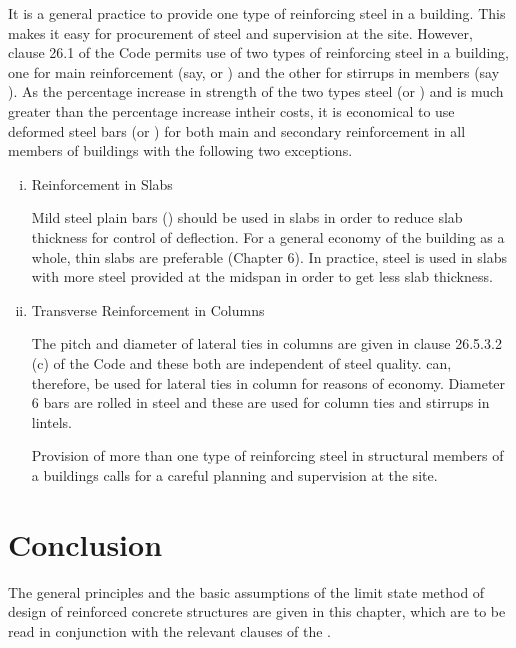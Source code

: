 It is a general practice to provide one type of reinforcing steel in a
building. This makes it easy for procurement of steel and supervision 
at the site. However, clause 26.1 of the Code permits use of two types
of reinforcing steel in a building, one for main reinforcement (say,
{\fefouronefive} or {\fefivezerozero}) and the other for stirrups in members
(say {\fetwofivezero}).
As the percentage increase in strength of the two types steel
\fefouronefive
(or {\fefivezerozero}) and {\fetwofivezero} is much greater than the
percentage increase intheir costs, it is economical to use deformed steel
bars {\fefouronefive} (or \fefivezerozero) for both main and secondary
reinforcement in all members of buildings with the following two exceptions.

\begin{enumerate}[(i)]
\item Reinforcement in Slabs

Mild steel plain bars (\fetwofivezero) should be used in slabs in order
to reduce slab thickness for control of deflection. For a general
economy of the building as a whole, thin slabs are preferable
(Chapter 6). In practice, {\fefouronefive} steel is used in slabs with
more steel provided at the midspan in order to get less slab thickness.

\item Transverse Reinforcement in Columns

The pitch and diameter of lateral ties in columns are given in clause
26.5.3.2 (c) of the Code and these both are independent of steel quality.
{\fetwofivezero} can, therefore, be used for lateral ties in column for
reasons of economy. Diameter 6 \mm bars are rolled in {\fetwofivezero}
steel and these are used for column ties and stirrups in lintels.

Provision of more than one type of reinforcing steel in structural
members of a buildings calls for a careful planning and supervision at
the site.
\end{enumerate}

\section{Conclusion}
The general principles and the basic assumptions of the limit state
method of design of reinforced concrete structures are given in this
chapter, which are to be read in conjunction with the relevant clauses
of the .


